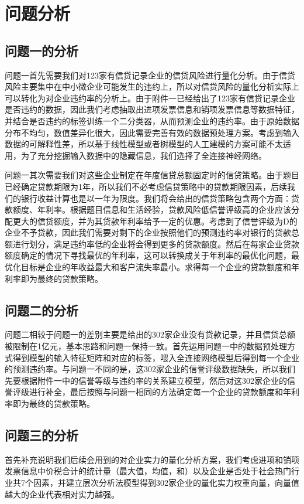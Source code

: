 \documentclass{cumcmthesis}
\begin{document}
\section{问题分析}
\subsection{问题一的分析}
问题一首先需要我们对123家有信贷记录企业的信贷风险进行量化分析。由于信贷风险主要集中在中小微企业可能发生的违约上，所以对信贷风险的量化分析实际上可以转化为对企业违约率的分析上。由于附件一已经给出了123家有信贷记录企业是否违约的数据，因此我们考虑抽取出进项发票信息和销项发票信息等数据特征，并结合是否违约的标签训练一个二分类器，从而预测企业的违约率。由于原始数据分布不均匀，数值差异化很大，因此需要完善有效的数据预处理方案。考虑到输入数据的可解释性差，所以基于线性模型或者树模型的人工建模的方案可能不太适用，为了充分挖掘输入数据中的隐藏信息，我们选择了全连接神经网络。

问题一其次需要我们对这些企业制定在年度信贷总额固定时的信贷策略。由于题目已经确定贷款期限为1年，所以我们不必考虑信贷策略中的贷款期限因素，后续我们的银行收益计算也是以一年为限度。我们将会给出的信贷策略包含两个方面：贷款额度、年利率。根据题目信息和生活经验，贷款风险低信誉评级高的企业应该分配更大的信贷额度，并为其贷款年利率给予一定的优惠。考虑到了信誉评级为D的企业不予贷款，因此我们需要对剩下的企业按照他们的预测违约率对银行的贷款总额进行划分，满足违约率低的企业将会得到更多的贷款额度。然后在每家企业贷款额度确定的情况下寻找最优的年利率，这可以转换成关于年利率的最优化问题，最优化目标是企业的年收益最大和客户流失率最小。求得每一个企业的贷款额度和年利率即为最终的贷款策略。

\subsection{问题二的分析}
问题二相较于问题一的差别主要是给出的302家企业没有贷款记录，并且信贷总额被限制在1亿元，基本思路和问题一保持一致。首先运用问题一中的数据预处理方式得到模型的输入特征矩阵和对应的标签，喂入全连接网络模型后得到每一个企业的预测违约率。与问题一不同的是，这302家企业的信誉评级数据缺失，所以我们先要根据附件一中的信誉等级与违约率的关系建立模型，然后对这302家企业的信誉评级进行补全，最后按照与问题一相同的方法确定每一个企业的贷款额度和年利率即为最终的贷款策略。
\subsection{问题三的分析}
首先补充说明我们后续会用到的对企业实力的量化分析方案，我们考虑进项和销项发票信息中价税合计的统计量（最大值，均值，和）以及企业是否处于社会热门行业共7个因素，并建立层次分析法模型得到302家企业的量化实力权重向量，向量值越大的企业代表相对实力越强。
\end{document}

